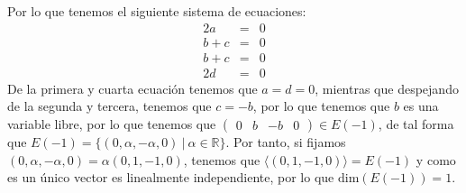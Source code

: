 \begin{itemize}
\begin{itemize}
    Por lo que tenemos el siguiente sistema de ecuaciones:
\begin{eqnarray*}
2a&=&0\\
b+c&=&0\\
b+c&=&0\\
2d&=&0
\end{eqnarray*}
De la primera y cuarta ecuaci\'on tenemos que $a=d=0$, mientras que despejando de la segunda y tercera, tenemos que $c=-b$, por lo que tenemos que $b$ es una variable libre, por lo que tenemos que $\begin{pmatrix}0&b&-b&0\end{pmatrix}\in E(-1)$, de tal forma que $E(-1)=\{(0,\alpha,-\alpha,0)~|~\alpha\in\mathbb{R}\}$.
Por tanto, si fijamos $(0,\alpha,-\alpha,0)=\alpha(0,1,-1,0)$, tenemos que $\langle(0,1,-1,0)\rangle=E(-1)$ y como es un \'unico vector es linealmente independiente, por lo que $\text{dim}(E(-1))=1$.



\end{itemize}
\end{itemize}
